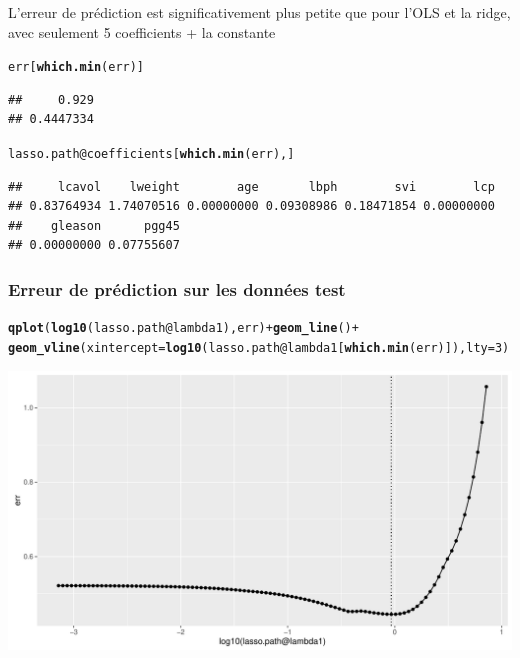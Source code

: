 \documentclass{beamer}\usepackage[]{graphicx}\usepackage[]{color}
\makeatletter
\newcommand{\hlnum}[1]{\textcolor[rgb]{0.686,0.059,0.569}{#1}}%
\newcommand{\hlopt}[1]{\textcolor[rgb]{0,0,0}{#1}}%
\newcommand{\hlstd}[1]{\textcolor[rgb]{0.345,0.345,0.345}{#1}}%
\newcommand{\hlkwc}[1]{\textcolor[rgb]{0.333,0.667,0.333}{#1}}%
\newcommand{\hlkwd}[1]{\textcolor[rgb]{0.737,0.353,0.396}{\textbf{#1}}}%
\newenvironment{kframe}{%
 \def\at@end@of@kframe{}%
 \ifinner\ifhmode%
  \def\at@end@of@kframe{\end{minipage}}%
  \begin{minipage}{\columnwidth}%
 \fi\fi%
 \def\FrameCommand##1{\hskip\@totalleftmargin \hskip-\fboxsep
 \colorbox{shadecolor}{##1}\hskip-\fboxsep
     \hskip-\linewidth \hskip-\@totalleftmargin \hskip\columnwidth}%
 \MakeFramed {\advance\hsize-\width
   \@totalleftmargin\z@ \linewidth\hsize
   \@setminipage}}%
 {\par\unskip\endMakeFramed%
 \at@end@of@kframe}
\newenvironment{knitrout}{}{} %
\makeatother
\begin{document}
\begin{frame}
L'erreur de prédiction est significativement plus petite que pour l'OLS et la ridge, avec seulement 5 coefficients + la constante
\begin{knitrout}\scriptsize
{}\color{fgcolor}\begin{kframe}
\begin{alltt}
\hlstd{err[}\hlkwd{which.min}\hlstd{(err)]}
\end{alltt}
\begin{verbatim}
##     0.929 
## 0.4447334
\end{verbatim}
\begin{alltt}
\hlstd{lasso.path}\hlopt{@}\hlkwc{coefficients}\hlstd{[}\hlkwd{which.min}\hlstd{(err), ]}
\end{alltt}
\begin{verbatim}
##     lcavol    lweight        age       lbph        svi        lcp 
## 0.83764934 1.74070516 0.00000000 0.09308986 0.18471854 0.00000000 
##    gleason      pgg45 
## 0.00000000 0.07755607
\end{verbatim}
\end{kframe}
\end{knitrout}

\end{frame}

\begin{frame}[containsverbatim]
  \frametitle{Erreur de prédiction sur les données test}

\begin{knitrout}\scriptsize
{}\color{fgcolor}\begin{kframe}
\begin{alltt}
\hlkwd{qplot}\hlstd{(}\hlkwd{log10}\hlstd{(lasso.path}\hlopt{@}\hlkwc{lambda1}\hlstd{), err)} \hlopt{+} \hlkwd{geom_line}\hlstd{()} \hlopt{+}
\hlkwd{geom_vline}\hlstd{(}\hlkwc{xintercept}\hlstd{=}\hlkwd{log10}\hlstd{(lasso.path}\hlopt{@}\hlkwc{lambda1}\hlstd{[}\hlkwd{which.min}\hlstd{(err)]),} \hlkwc{lty}\hlstd{=}\hlnum{3}\hlstd{)}
\end{alltt}
\end{kframe}
\includegraphics[width=\textwidth]{figures/lasso-unnamed-chunk-64-1} 

\end{knitrout}
\end{frame}
\end{document}
